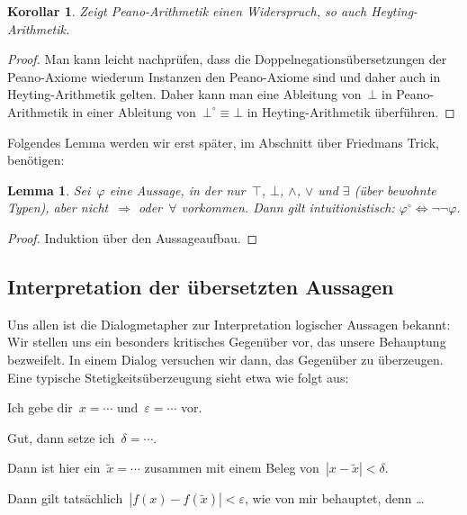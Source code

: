 \documentclass[a4paper,ngerman,12pt]{scrartcl}
\theoremstyle{definition}
\theoremstyle{plain}
\newtheorem{lemma}[defn]{Lemma}
\newtheorem{kor}[defn]{Korollar}
\theoremstyle{remark}
\renewcommand{\_}{\mathpunct{.}\,}
\newcommand{\?}{\,{:}\,}
\newcommand{\Alice}{\item[Alice]}
\newcommand{\Eve}{\item[Eve]}
\newenvironment{dialogue}{%
  \begin{list}{}{%
    \settowidth{\labelwidth}{\qquad\emph{Alice:}}
    \setlength{\labelsep}{0.3cm}
    \setlength{\leftmargin}{\labelwidth}
    \addtolength{\leftmargin}{\labelsep}
    \setlength{\rightmargin}{0pt}
    \setlength{\parsep}{0.5ex plus 0.2ex minus 0.1ex}
    \setlength{\itemsep}{0 ex plus 0.2ex}
    \renewcommand{\makelabel}[1]{\qquad\emph{##1:}\hfil}
    }
}{\end{list}}
\begin{document}
\begin{kor}Zeigt Peano-Arithmetik einen Widerspruch, so auch
Heyting-Arithmetik.\end{kor}
\begin{proof}Man kann leicht nachprüfen, dass die
Doppelnegationsübersetzungen der Peano-Axiome wiederum Instanzen den
Peano-Axiome sind und daher auch in Heyting-Arithmetik gelten. Daher kann man
eine Ableitung von~$\bot$ in Peano-Arithmetik in einer Ableitung
von~$\bot^\circ \equiv \bot$ in Heyting-Arithmetik überführen.\end{proof}

Folgendes Lemma werden wir erst später, im Abschnitt über Friedmans Trick, benötigen:
\begin{lemma}\label{dnt:geom}Sei~$\varphi$ eine Aussage, in der nur~$\top$, $\bot$,
$\wedge$, $\vee$ und $\exists$ (über
bewohnte Typen), aber nicht~$\Rightarrow$ oder~$\forall$ vorkommen. Dann gilt
intuitionistisch: $\varphi^\circ \Longleftrightarrow \neg\neg\varphi$.
\end{lemma}
\begin{proof}Induktion über den Aussageaufbau.\end{proof}


\subsection{Interpretation der übersetzten Aussagen}

Uns allen ist die Dialogmetapher zur Interpretation logischer Aussagen bekannt:
Wir stellen uns ein besonders kritisches Gegenüber vor, das unsere Behauptung
bezweifelt. In einem Dialog versuchen wir dann, das Gegenüber zu überzeugen.
Eine typische Stetigkeitsüberzeugung sieht etwa wie folgt aus:

\begin{dialogue}
\Eve Ich gebe dir~$x = \cdots$ und~$\varepsilon = \cdots$ vor.
\Alice Gut, dann setze ich~$\delta = \cdots$.
\Eve Dann ist hier ein~$\tilde x = \cdots$ zusammen mit einem Beleg von~$|x -
\tilde x| < \delta$.
\Alice Dann gilt tatsächlich~$|f(x) - f(\tilde x)| < \varepsilon$,
wie von mir behauptet, denn \ldots
\end{dialogue}
\end{document}
